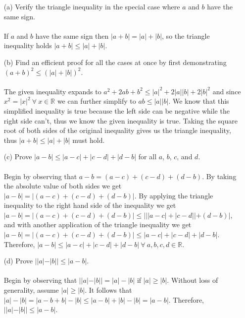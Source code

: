 \documentclass[11pt]{article}
\def\R{{\mathbb{R}}}
\newenvironment{exer}[1]
    {\renewcommand\theinnercustomexer{#1}\innercustomexer\upshape}
    {\endinnercustomexer}
\begin{document}
\begin{exer}{1.2.6}
    \begin{enumerate}
        \item[(a)]
            Verify the triangle inequality in the special case where $a$ and $b$ have the same sign. \\ \\
            If $a$ and $b$ have the same sign then $|a+b|=|a|+|b|$, so the triangle inequality holds $|a+b|\leq |a|+|b|$.
        \item[(b)]
            Find an efficient proof for all the cases at once by first demonstrating $(a+b)^2\leq(|a|+|b|)^2$. \\ \\
            The given inequality expands to $a^2+2ab+b^2\leq|a|^2+2|a||b|+2|b|^2$ and since $x^2=|x|^2~\forall~x\in\R$ we can further simplify to $ab\leq |a||b|$. We know that this simplified inequality is true because the left side can be negative while the right side can't, thus we know the given inequality is true. Taking the square root of both sides of the original inequality gives us the triangle inequality, thus $|a+b|\leq|a|+|b|$ must hold.
        \item[(c)]
            Prove $|a-b|\leq|a-c|+|c-d|+|d-b|$ for all $a$, $b$, $c$, and $d$. \\ \\
            Begin by observing that $a-b=(a-c)+(c-d)+(d-b)$. By taking the absolute value of both sides we get $|a-b|=|(a-c)+(c-d)+(d-b)|$. By applying the triangle inequality to the right hand side of the inequality we get $|a-b|=|(a-c)+(c-d)+(d-b)|\leq|||a-c|+|c-d||+(d-b)|$, and with another application of the triangle inequality we get $|a-b|=|(a-c)+(c-d)+(d-b)|\leq|a-c|+|c-d|+|d-b|$. Therefore, $|a-b|\leq|a-c|+|c-d|+|d-b|~\forall~a,b,c,d\in\R$.
        \item[(d)]
            Prove $||a|-|b||\leq|a-b|$. \\ \\
            Begin by observing that $||a|-|b||=|a|-|b|$ if $|a|\geq|b|$. Without loss of generality, assume $|a|\geq|b|$. It follows that $|a|-|b|=|a-b+b|-|b|\leq|a-b|+|b|-|b|=|a-b|$. Therefore, $||a|-|b||\leq|a-b|$.
    \end{enumerate}
\end{exer}
\end{document}
